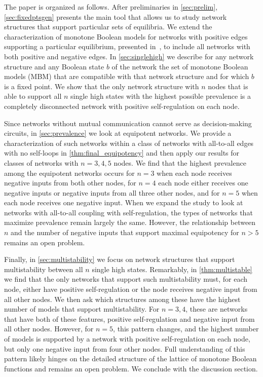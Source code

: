 \documentclass[12pt]{amsart}
\theoremstyle{definition}
\begin{document}
The paper is organized as follows. After preliminaries in \cref{sec:prelim}, \cref{sec:fixedptsgen} presents the main tool that allows us to study network structures that support particular sets of equilibria. We extend the characterization of monotone Boolean models for networks with positive edges supporting a particular equilibrium, presented in~\cite{adigwe_characterization_2026}, to include all networks with both positive and negative edges. In \cref{sec:singlehigh} we describe for any network structure and any Boolean state $b$ of the network the set of monotone Boolean models (MBM) that are compatible with that network structure and for which $b$ is a fixed point. We show that the only network structure with $n$ nodes that is able to support all $n$ single high states with the highest possible prevalence is a completely disconnected network with positive self-regulation on each node.

Since networks without mutual communication cannot serve as decision-making circuits, in \cref{sec:prevalence} we look at equipotent networks. We provide a characterization of such networks within a class of networks with all-to-all edges with no self-loops in \cref{thm:final_equipotency} and then apply our results for classes of networks with $n=3,4,5$ nodes. We find that the highest prevalence among the equipotent networks occurs for $n=3$ when each node receives negative inputs from both other nodes, for $n=4$ each node either receives one negative inputs or negative inputs from all three other nodes, and for $n=5$ when each node receives one negative input. When we expand the study to look at networks with all-to-all coupling with self-regulation, the types of networks that maximize prevalence remain largely the same. However, the relationship between $n$ and the number of negative inputs that support maximal equipotency for $n>5$ remains an open problem. 

Finally, in \cref{sec:multistability} we focus on network structures that support multistability between all $n$ single high states. Remarkably, in \cref{thm:multistable} we find that the only networks that support such multistability must, for each node, either have positive self-regulation or the node receives negative input from all other nodes. We then ask which structures among these have the highest number of models that support multistability. For $n=3,4$, these are networks that have both of these features, positive self-regulation and negative input from all other nodes. However, for $n=5$, this pattern changes, and the highest number of models is supported by a network with positive self-regulation on each node, but only one negative input from four other nodes. Full understanding of this pattern likely hinges on the detailed structure of the lattice of monotone Boolean functions and remains an open problem. We conclude with the discussion section.
\end{document}
